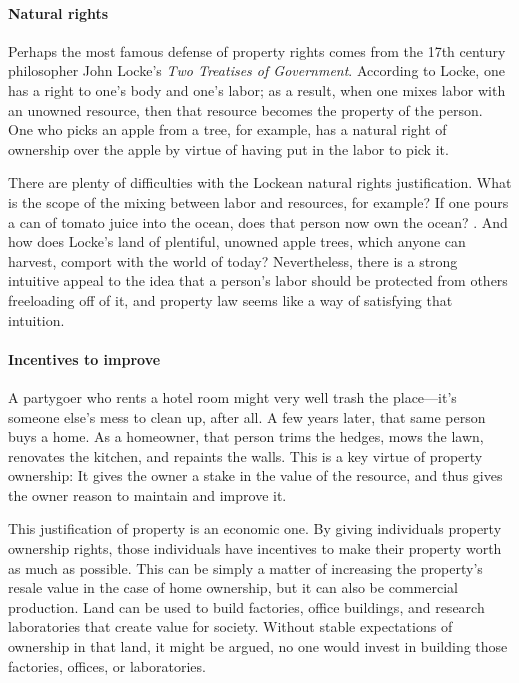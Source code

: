 \paragraph{Natural rights} Perhaps the most famous defense of property rights
comes from the 17th century philosopher John Locke's \emph{Two Treatises of
Government}. According to Locke, one has a right to one's body and one's labor;
as a result, when one mixes labor with an unowned resource, then that resource
becomes the property of the person. One who picks an apple from a tree, for
example, has a natural right of ownership over the apple by virtue of having put
in the labor to pick it.


There are plenty of difficulties with the Lockean natural rights justification.
What
is the scope of the mixing between labor and resources, for example? If one
pours a can of tomato juice into the ocean, does that person now own the ocean?
. And how does Locke's land of
plentiful, unowned
apple trees, which anyone can harvest, comport with the world of today?
Nevertheless, there is a strong intuitive appeal to the idea that a person's
labor should be protected from others freeloading off of it, and property law
seems like a way of satisfying that intuition.

\paragraph{Incentives to improve} A partygoer who rents a hotel room might very
well trash the place---it's someone else's mess to clean up, after all. A few
years later, that same person buys a home. As a homeowner, that person trims the
hedges, mows the lawn, renovates the kitchen, and repaints the walls. This is a
key virtue of property ownership: It gives the owner a stake in the value of the
resource, and thus gives the owner reason to maintain and improve it.

This justification of property is an economic one. By giving individuals
property
ownership rights, those individuals have incentives to make their property worth
as much as possible. This can be simply a matter of increasing the property's
resale value in the case of home ownership, but it can also be commercial
production. Land can be used to build factories, office buildings, and research
laboratories that create value for society. Without stable expectations of
ownership in that land, it might be argued, no one would invest in building
those factories, offices, or laboratories.

